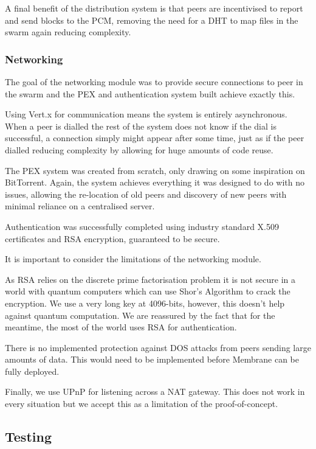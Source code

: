\documentclass[11pt, a4paper, twoside]{report}
\begin{document}
A final benefit of the distribution system is that peers are incentivised to report and send blocks to the PCM, removing the need for a DHT to map files in the swarm again reducing complexity.

\subsubsection{Networking}

The goal of the networking module was to provide secure connections to peer in the swarm and the PEX and authentication system built achieve exactly this.

Using Vert.x for communication means the system is entirely asynchronous. When a peer is dialled the rest of the system does not know if the dial is successful, a connection simply might appear after some time, just as if the peer dialled reducing complexity by allowing for huge amounts of code reuse.

The PEX system was created from scratch, only drawing on some inspiration on BitTorrent. Again, the system achieves everything it was designed to do with no issues, allowing the re-location of old peers and discovery of new peers with minimal reliance on a centralised server.

Authentication was successfully completed using industry standard X.509 certificates and RSA encryption, guaranteed to be secure.

It is important to consider the limitations of the networking module.

As RSA relies on the discrete prime factorisation problem it is not secure in a world with quantum computers which can use Shor's Algorithm to crack the encryption. We use a very long key at 4096-bits, however, this doesn't help against quantum computation. We are reassured by the fact that for the meantime, the most of the world uses RSA for authentication.

There is no implemented protection against DOS attacks from peers sending large amounts of data. This would need to be implemented before Membrane can be fully deployed.

Finally, we use UPnP for listening across a NAT gateway. This does not work in every situation but we accept this as a limitation of the proof-of-concept.

\subsection{Testing}
\end{document}
